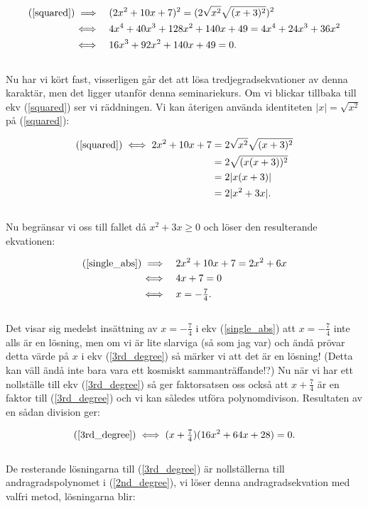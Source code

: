 \documentclass{article}
\begin{document}
\begin{align}
  \text{(\ref{squared})} \implies \quad & (2x^{2} + 10x + 7)^{2} = (2\sqrt{x^{2}}\sqrt{(x+3)^{2}})^{2} \nonumber\\
  \iff \quad & 4x^{4} + 40x^{3} + 128x^{2} + 140x + 49 = 4x^{4} + 24x^{3} + 36x^{2} \nonumber\\
  \iff \quad & 16x^{3} + 92x^{2} + 140x + 49 = 0\text{.} \label{3rd_degree}
\end{align}
\\
Nu har vi kört fast, visserligen går det att lösa tredjegradsekvationer av denna karaktär, men det ligger utanför denna seminariekurs. Om vi blickar tillbaka till ekv (\ref{squared}) ser vi räddningen. Vi kan återigen använda identiteten $|x| = \sqrt{x^{2}}$ på (\ref{squared}):

\begin{align}
  \text(\ref{squared}) \iff 2x^{2} + 10x + 7 &= 2\sqrt{x^{2}}\sqrt{(x+3)^{2}}\nonumber\\
                        &= 2\sqrt{(x(x+3))^{2}}\nonumber\\
                        &= 2|x(x+3)|\nonumber\\
                        &= 2|x^{2} + 3x|\text{.} \label{single_abs}
\end{align}
\\
Nu begränsar vi oss till fallet då $x^{2} + 3x \geq 0$ och löser den resulterande ekvationen:

\begin{align*}
  \text{(\ref{single_abs})} \implies \quad & 2x^{2} + 10x + 7 = 2x^{2} + 6x\\
  \iff \quad & 4x + 7 = 0 \\
  \iff \quad & x = -\tfrac{7}{4}\text{.}
\end{align*}
\\
Det visar sig medelst insättning av $x=-\tfrac{7}{4}$ i ekv (\ref{single_abs}) att $x = -\tfrac{7}{4}$ inte alls är en lösning, men om vi är lite slarviga (så som jag var) och ändå prövar detta värde på $x$ i ekv (\ref{3rd_degree}) så märker vi att det är en lösning! (Detta kan väll ändå inte bara vara ett kosmiskt sammanträffande!?) Nu när vi har ett nollställe till ekv (\ref{3rd_degree}) så ger faktorsatsen oss också att $x + \tfrac{7}{4}$ är en faktor till (\ref{3rd_degree}) och vi kan således utföra polynomdivison. Resultaten av en sådan division ger:

\begin{gather}
  \text{(\ref{3rd_degree})} \iff (x + \tfrac{7}{4})(16x^{2} + 64x + 28) = 0\text{.} \label{2nd_degree}
\end{gather}
\\
De resterande lösningarna till (\ref{3rd_degree}) är nollställerna till andragradspolynomet i (\ref{2nd_degree}), vi löser denna andragradsekvation med valfri metod, lösningarna blir:
\end{document}
